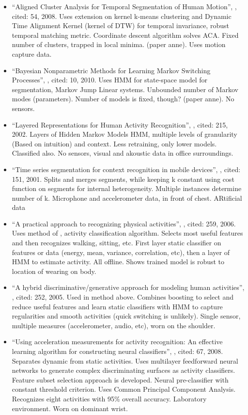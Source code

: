 \begin{itemize}
  \item ``Aligned Cluster Analysis for Temporal Segmentation of Human Motion'', \cite{zhou2008aligned}, cited: 54, 2008. Uses extension on kernel k-means clustering and Dynamic Time Alignment Kernel (kernel of DTW) for temporal invariance, robust temporal matching metric. Coordinate descent algorithm solves ACA. Fixed number of clusters, trapped in local minima. (paper anne). Uses motion capture data.
  \item ``Bayesian Nonparametric Methods for Learning Markov Switching Processes'', \cite{fox2010bayesian}, cited: 10, 2010. Uses HMM for state-space model for segmentation, Markov Jump Linear systems. Unbounded number of Markov modes (parameters). Number of models is fixed, though? (paper anne). No sensors.
  \item ``Layered Representations for Human Activity Recognition'', \cite{oliver2002layered}, cited: 215, 2002. Layers of Hidden Markov Models HMM, multiple levels of granularity (Based on intuition) and context. Less retraining, only lower models. Classified also. No sensors, visual and akoustic data in office surroundings.
  \item ``Time series segmentation for context recognition in mobile devices'', \cite{himberg2001time}, cited: 151, 2001. Splits and merges segments, while keeping k constant using cost function on segments for internal heterogeneity. Multiple instances determine number of k. Microphone and accelerometer data, in front of chest. ARtificial data
  \item ``A practical approach to recognizing physical activities'', \cite{lester2006practical}, cited: 259, 2006. Uses method of \cite{lester2005hybrid}, activity classification algorithm. Selects most useful features and then recognizes walking, sitting, etc. First layer static classifier on features or data (energy, mean, variance, correlation, etc), then a layer of HMM to estimate activity. All offline. Shows trained model is robust to location of wearing on body.
  \item ``A hybrid discriminative/generative approach for modeling human activities'', \cite{lester2005hybrid}, cited: 252, 2005. Used in method above. Combines boosting to select and reduce useful features and learn static classifiers with HMM to capture regularities and smooth activities (quick switching is unlikely). Single sensor, multiple measures (accelerometer, audio, etc), worn on the shoulder.
  \item ``Using acceleration measurements for activity recognition: An effective learning algorithm for constructing neural classifiers'', \cite{yang2008using}, cited: 67, 2008. Separates dynamic from static activities. Uses multilayer feedforward neural networks to generate complex discriminating surfaces as activity classifiers. Feature subset selection approach is developed. Neural pre-classifier with constant threshold criterion. Uses Common Principal Component Analysis. Recognizes eight activities with 95\% overall accuracy. Laboratory environment. Worn on dominant wrist.

\end{itemize}
